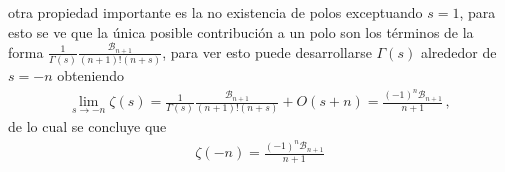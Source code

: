 otra propiedad importante es la no existencia de polos exceptuando $s=1$, para esto se ve que la única posible contribución a un polo son los términos de la forma  $	\frac{1}{\Gamma (s)} \frac{ \mathcal{B} _{n+1}}{ (n+1)! (n + s)}$, para ver esto puede desarrollarse $\Gamma (s)$ alrededor de $s = -n$ obteniendo
\begin{align}
	\lim _{s \rightarrow -n }	
	\zeta ( s  ) = 
	\frac{1}{\Gamma (s)}
	\frac{ \mathcal{B} _{n+1}}{ (n+1)! (n + s)}
	+ O (s + n) = 
	\frac{(-1) ^n \mathcal{B} _{n+1}}
		{n+1}
	\, ,
\end{align}
de lo cual se concluye que
\begin{align}
	\zeta ( -n  ) = 
	\frac{(-1) ^n \mathcal{B} _{n+1}}{n+1}
\end{align}














